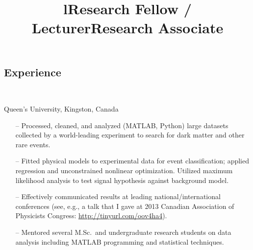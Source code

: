 \documentclass[overlapped, line, 10pt]{res}
\begin{document}
\begin{resume}
\section{\sc Experience}
\begin{format}
\title{l}  \\
\body
\end{format}

\title{Research Fellow / Lecturer}
\begin{position}
Queen's University, Kingston, Canada
\begin{itemize}
\item[--] Processed, cleaned, and analyzed (MATLAB, Python) large datasets collected by a world-leading experiment to search for dark matter and other rare events. 
\item[--] Fitted physical models to experimental data for event classification; applied regression and unconstrained nonlinear optimization. Utilized maximum likelihood analysis to test signal hypothesis against background model.
\item[--] Effectively communicated results at leading national/international conferences (see, e.g., a talk that I gave at 2013 Canadian Association of Physicists Congress: \url{http://tinyurl.com/oov4ha4}).
\item[--]Mentored several M.Sc.~and undergraduate research students on data analysis including MATLAB programming and statistical techniques.
\end{itemize}
\end{position}

\title{Research Associate}
\end{resume}
\end{document}
